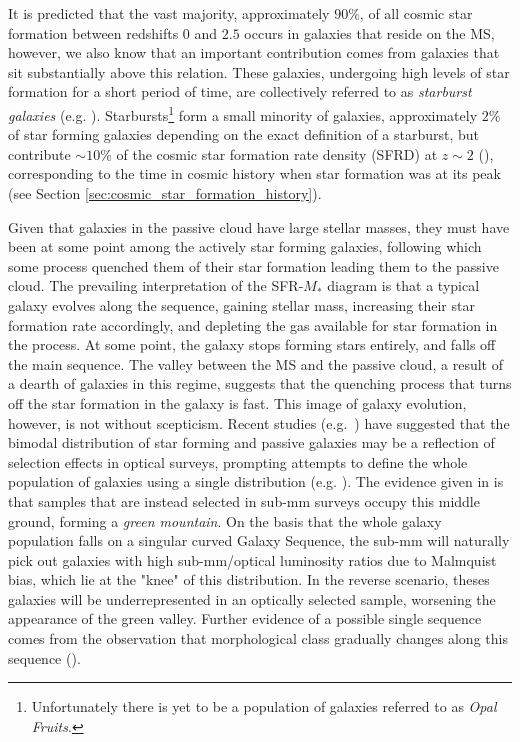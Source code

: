 It is predicted that the vast majority, approximately $90\%$, of all cosmic star formation between redshifts $0$ and $2.5$ occurs in galaxies that reside on the MS, however, we also know that an important contribution comes from galaxies that sit substantially above this relation. These galaxies, undergoing high levels of star formation for a short period of time, are collectively referred to as \textit{starburst galaxies} (e.g. \citealt{Muxlow_2006, Rinaldi_2022}). Starbursts\footnote{Unfortunately there is yet to be a population of galaxies referred to as \textit{Opal Fruits}.} form a small minority of galaxies, approximately $2\%$ of star forming galaxies depending on the exact definition of a starburst, but contribute $\sim 10\%$ of the cosmic star formation rate density (SFRD) at $z \sim 2$ (\citealt{Rodighiero_2011}), corresponding to the time in cosmic history when star formation was at its peak (see Section \ref{sec:cosmic_star_formation_history}).

Given that galaxies in the passive cloud have large stellar masses, they must have been at some point among the actively star forming galaxies, following which some process quenched them of their star formation leading them to the passive cloud. The prevailing interpretation of the SFR-$M_*$ diagram is that a typical galaxy evolves along the sequence, gaining stellar mass, increasing their star formation rate accordingly, and depleting the gas available for star formation in the process. At some point, the galaxy stops forming stars entirely, and falls off the main sequence. The valley between the MS and the passive cloud, a result of a dearth of galaxies in this regime, suggests that the quenching process that turns off the star formation in the galaxy is fast. This image of galaxy evolution, however, is not without scepticism. Recent studies \mbox{(e.g. \citealt{Eales_2018a, Bremer_2018, Phillipps_2019})} have suggested that the bimodal distribution of star forming and passive galaxies may be a reflection of selection effects in optical surveys, prompting attempts to define the whole population of galaxies using a single distribution (e.g. \citealt{Corcho-Caballero_2020}). The evidence given in \citealt{Eales_2018a} is that samples that are instead selected in sub-mm surveys occupy this middle ground, forming a \textit{green mountain}. On the basis that the whole galaxy population falls on a singular curved Galaxy Sequence, the sub-mm will naturally pick out galaxies with high sub-mm/optical luminosity ratios due to Malmquist bias, which lie at the "knee" of this distribution. In the reverse scenario, theses galaxies will be underrepresented in an optically selected sample, worsening the appearance of the green valley. Further evidence of a possible single sequence comes from the observation that morphological class gradually changes along this sequence (\citealt{Eales_2018b}).

